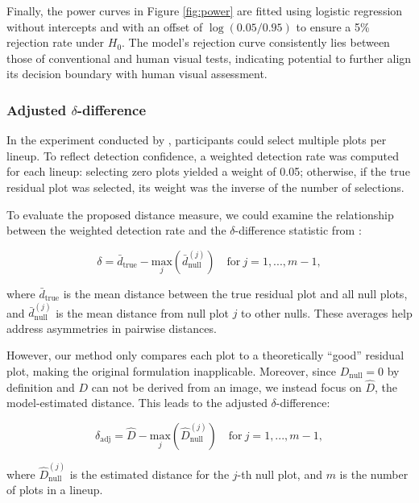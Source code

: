 \documentclass[]{interact}
\theoremstyle{plain}%
\theoremstyle{definition}
\theoremstyle{remark}
\begin{document}
Finally, the power curves in Figure \ref{fig:power} are fitted using
logistic regression without intercepts and with an offset of
\(\log(0.05/0.95)\) to ensure a 5\% rejection rate under \(H_0\). The
model's rejection curve consistently lies between those of conventional
and human visual tests, indicating potential to further align its
decision boundary with human visual assessment.

\subsubsection{\texorpdfstring{Adjusted
\(\delta\)-difference}{Adjusted \textbackslash delta-difference}}\label{adjusted-delta-difference}

In the experiment conducted by \citet{li2024plot}, participants could
select multiple plots per lineup. To reflect detection confidence, a
weighted detection rate was computed for each lineup: selecting zero
plots yielded a weight of 0.05; otherwise, if the true residual plot was
selected, its weight was the inverse of the number of selections.

To evaluate the proposed distance measure, we could examine the
relationship between the weighted detection rate and the
\(\delta\)-difference statistic from \citet{chowdhury2018measuring}:

\[
\delta = \bar{d}_{\text{true}} - \underset{j}{\text{max}}\left(\bar{d}_{\text{null}}^{(j)}\right) \quad \text{for}~j = 1,...,m-1,
\]

\noindent where \(\bar{d}_{\text{true}}\) is the mean distance between
the true residual plot and all null plots, and
\(\bar{d}_{\text{null}}^{(j)}\) is the mean distance from null plot
\(j\) to other nulls. These averages help address asymmetries in
pairwise distances.

However, our method only compares each plot to a theoretically ``good''
residual plot, making the original formulation inapplicable. Moreover,
since \(D_{\text{null}} = 0\) by definition and \(D\) can not be derived
from an image, we instead focus on \(\hat{D}\), the model-estimated
distance. This leads to the adjusted \(\delta\)-difference:

\[
\delta_{\text{adj}} = \hat{D} - \underset{j}{\text{max}}\left(\hat{D}_{\text{null}}^{(j)}\right) \quad \text{for}~j = 1,...,m-1,
\]

\noindent where \(\hat{D}_{\text{null}}^{(j)}\) is the estimated
distance for the \(j\)-th null plot, and \(m\) is the number of plots in
a lineup.
\end{document}
